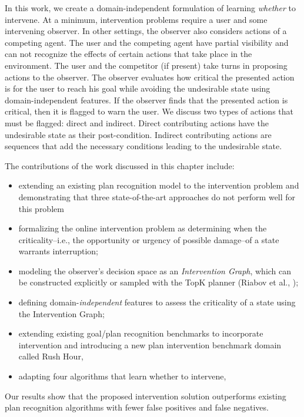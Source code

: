\documentclass[doctor]{thesis} %
\theoremstyle{plain}
\begin{document}
In this work, we create a domain-independent formulation of learning \emph{whether} to intervene.
At a minimum, intervention problems require a user and some intervening observer.
In other settings, the observer also considers actions of a competing agent.
The user and the competing agent have partial visibility and can not recognize the effects of certain actions that take place in the environment.
The user and the competitor (if present) take turns in proposing actions to the observer. The observer evaluates how critical the presented action is for the user to reach his goal while avoiding the undesirable state using  domain-independent features. If the observer finds that the presented action is critical, then it is flagged to warn the user. We discuss two types of actions that must be flagged: direct and indirect. Direct contributing actions have the undesirable state as their post-condition. Indirect contributing actions are sequences that add the necessary conditions leading to the undesirable state.


The contributions of the work discussed in this chapter include:
\begin{itemize}
\item extending an existing plan recognition model to the intervention problem and demonstrating that three state-of-the-art approaches do not perform well for this problem
\item formalizing the online intervention problem as determining when the criticality--i.e., the opportunity or urgency of possible damage--of a state warrants interruption; 
\item modeling the observer's decision space as an \emph{Intervention Graph}, which can be constructed explicitly or sampled with the TopK planner (Riabov et al., \citeyear{riabov2014});
\item defining domain-\emph{independent} features to assess the criticality of a state using the Intervention Graph;
\item extending existing goal/plan recognition benchmarks \cite{ramirez2009plan,ramirez2010probabilistic} to incorporate intervention and introducing a new plan intervention benchmark domain called Rush Hour, 
\item adapting four algorithms that learn whether to intervene, 
\end{itemize}
Our results show that the proposed intervention solution  outperforms existing plan recognition algorithms with fewer false positives and false negatives.
\end{document}
